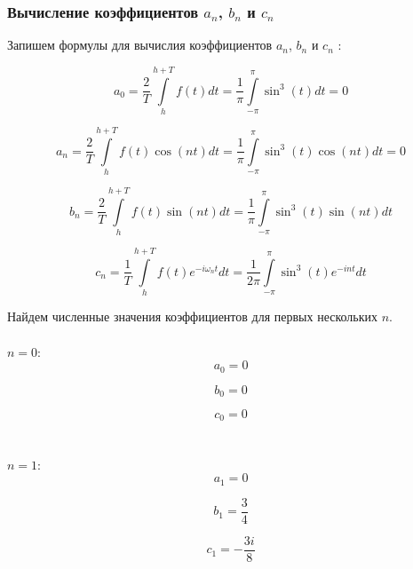 \documentclass[a5paper, 10pt]{article}
\theoremstyle{definition}
\theoremstyle{plain}
\theoremstyle{remark}
\begin{document}
\subsubsection{Вычисление коэффициентов $a_n$, $b_n$ и $c_n$}

Запишем формулы для вычислия коэффициентов $a_n$, $b_n$ и $c_n$ :

\begin{equation}
a_0 =  \frac{2}{T} \int \limits_{h}^{h + T} f(t) dt =   \frac{1}{\pi} \int \limits_{-\pi}^{\pi} \sin^3(t) dt = 0
\end{equation}


\begin{equation}
a_n = \frac{2}{T} \int \limits_{h}^{h + T} f(t) \cos (nt) dt =  \frac{1}{\pi} \int \limits_{-\pi}^{\pi} \sin^3(t) \cos (nt) dt = 0
\end{equation}

\begin{equation}
b_n = \frac{2}{T} \int \limits_{h}^{h + T} f(t) \sin (nt) dt =  \frac{1}{\pi} \int \limits_{-\pi}^{\pi} \sin^3(t) \sin (nt) dt 
\end{equation}

\begin{equation}
c_n = \frac{1}{T} \int \limits_{h}^{h + T} f(t) e^{-i \omega_n t} dt =  \frac{1}{2 \pi} \int \limits_{-\pi}^{\pi} \sin^3(t) e^{-i n t} dt  
\end{equation}

Найдем численные значения коэффициентов для первых нескольких $n$. \\
\\
$n = 0:$
\begin{equation}
a_0  = 0
\end{equation}

\begin{equation}
b_0  = 0
\end{equation}

\begin{equation}
c_0  = 0
\end{equation}
\\
\\

$n = 1:$
\begin{equation}
a_1 = 0
\end{equation}

\begin{equation}
b_1 = \frac{3}{4}
\end{equation}

\begin{equation}
c_1  = - \frac{3 i  }{8}
\end{equation}
\\
\\
\end{document}
